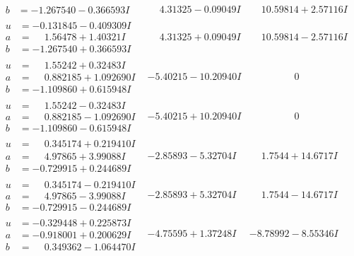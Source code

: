 \documentclass[1p]{elsarticle_modified}
\theoremstyle{definition}
\begin{document}
$$\begin{array}{c|c|c}
\begin{aligned}
b &= -1.267540 - 0.366593 I\end{aligned}
 & \phantom{-}4.31325 - 0.09049 I & \phantom{-}10.59814 + 2.57116 I \\ \hline\begin{aligned}
u &= -0.131845 - 0.409309 I \\
a &= \phantom{-}1.56478 + 1.40321 I \\
b &= -1.267540 + 0.366593 I\end{aligned}
 & \phantom{-}4.31325 + 0.09049 I & \phantom{-}10.59814 - 2.57116 I \\ \hline\begin{aligned}
u &= \phantom{-}1.55242 + 0.32483 I \\
a &= \phantom{-}0.882185 + 1.092690 I \\
b &= -1.109860 + 0.615948 I\end{aligned}
 & -5.40215 - 10.20940 I & \phantom{-0.000000 } 0 \\ \hline\begin{aligned}
u &= \phantom{-}1.55242 - 0.32483 I \\
a &= \phantom{-}0.882185 - 1.092690 I \\
b &= -1.109860 - 0.615948 I\end{aligned}
 & -5.40215 + 10.20940 I & \phantom{-0.000000 } 0 \\ \hline\begin{aligned}
u &= \phantom{-}0.345174 + 0.219410 I \\
a &= \phantom{-}4.97865 + 3.99088 I \\
b &= -0.729915 + 0.244689 I\end{aligned}
 & -2.85893 - 5.32704 I & \phantom{-}1.7544 + 14.6717 I \\ \hline\begin{aligned}
u &= \phantom{-}0.345174 - 0.219410 I \\
a &= \phantom{-}4.97865 - 3.99088 I \\
b &= -0.729915 - 0.244689 I\end{aligned}
 & -2.85893 + 5.32704 I & \phantom{-}1.7544 - 14.6717 I \\ \hline\begin{aligned}
u &= -0.329448 + 0.225873 I \\
a &= -0.918001 + 0.200629 I \\
b &= \phantom{-}0.349362 - 1.064470 I\end{aligned}
 & -4.75595 + 1.37248 I & -8.78992 - 8.55346 I \\ \hline\begin{aligned}

\end{aligned}
\end{array}$$
\end{document}

